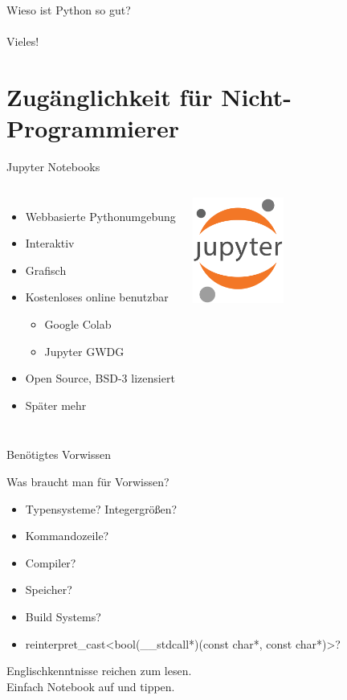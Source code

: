 \documentclass{beamer}
\begin{document}
\begin{frame}
\begin{center}
{ \Huge Wieso ist Python so gut?}\\~\\
\pause
Vieles!
\end{center}
\end{frame}

\section{Zug\"anglichkeit f\"ur Nicht-Programmierer}

\begin{frame}{Jupyter Notebooks}
\begin{columns}[onlytextwidth,T]
\column{\dimexpr\linewidth-30mm-5mm}
\begin{itemize}
\item Webbasierte Pythonumgebung
\item Interaktiv
\item Grafisch
\item Kostenloses online benutzbar
\begin{itemize}
\item Google Colab
\item Jupyter GWDG
\end{itemize}
\item Open Source, BSD-3 lizensiert
\item Sp\"ater mehr
\end{itemize}
\column{30mm}
\includegraphics[width=30mm]{./assets/jupyter.png}
\end{columns}
\end{frame}

\begin{frame}{Ben\"otigtes Vorwissen}
\begin{center}
\LARGE Was braucht man f\"ur Vorwissen?
\end{center}
\begin{itemize}
\item Typensysteme? Integergr\"o\ss{}en?
\item Kommandozeile?
\item Compiler?
\item Speicher?
\item Build Systems?
\item reinterpret\_cast\textless bool(\_\_stdcall*)(const char*, const char*)\textgreater?
\end{itemize}
\begin{center}
\Large Englischkenntnisse reichen zum lesen.\\
Einfach Notebook auf und tippen.
\end{center}
\end{frame}
\end{document}
